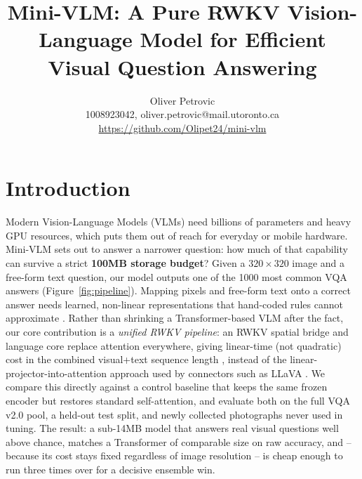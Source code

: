 \documentclass[final]{article}
\title{Mini-VLM: A Pure RWKV Vision-Language Model for Efficient Visual Question Answering}
\author{%
  Oliver Petrovic \\
  1008923042, oliver.petrovic@mail.utoronto.ca\\
  \url{https://github.com/Olipet24/mini-vlm}\\
}
\begin{document}
\maketitle

\vspace{-0.75in}

\section*{Introduction}

Modern Vision-Language Models (VLMs) need billions of parameters and heavy GPU resources, which
puts them out of reach for everyday or mobile hardware. Mini-VLM sets out to answer a narrower
question: how much of that capability can survive a strict \textbf{100MB storage budget}? Given a
$320\times320$ image and a free-form text question, our model outputs one of the 1000 most common
VQA answers (Figure~\ref{fig:pipeline}). Mapping pixels and free-form text onto a correct answer
needs learned, non-linear representations that hand-coded rules cannot approximate
\citep{goyal2017vqa}. Rather than shrinking a Transformer-based VLM after the fact, our core
contribution is a \emph{unified RWKV pipeline}: an RWKV spatial bridge and language core replace
attention everywhere, giving linear-time (not quadratic) cost in the combined visual+text sequence
length \citep{peng2023rwkv}, instead of the linear-projector-into-attention approach used by
connectors such as LLaVA \citep{liu2023llava}. We compare this directly against a control baseline
that keeps the same frozen encoder but restores standard self-attention, and evaluate both on the
full VQA v2.0 pool, a held-out test split, and newly collected photographs never used in tuning.
The result: a sub-14MB model that answers real visual questions well above chance, matches a
Transformer of comparable size on raw accuracy, and -- because its cost stays fixed regardless of
image resolution -- is cheap enough to run three times over for a decisive ensemble win.
\end{document}
